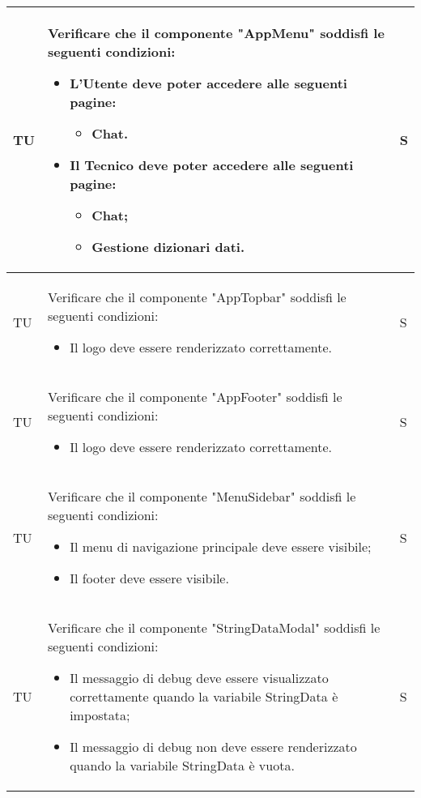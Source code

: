 \begin{adjustwidth}{-0.5cm}{-0.5cm}
\begin{longtable}{|P{1.5cm}|>{\raggedright}P{9.5cm}|>{\arraybackslash}P{1.5cm}|}
    TU & Verificare che il componente "AppMenu" soddisfi le seguenti condizioni:
    \begin{itemize}
      \item L'Utente deve poter accedere alle seguenti pagine:
      \begin{itemize}
        \item Chat.
      \end{itemize}
      \item Il Tecnico deve poter accedere alle seguenti pagine:
      \begin{itemize}
        \item Chat;
        \item Gestione dizionari dati.
      \end{itemize}
    \end{itemize} & S \\
    \hline TU & Verificare che il componente "AppTopbar" soddisfi le seguenti condizioni:
    \begin{itemize}
      \item Il logo deve essere renderizzato correttamente.
    \end{itemize} & S \\
    \hline TU & Verificare che il componente "AppFooter" soddisfi le seguenti condizioni:
    \begin{itemize}
      \item Il logo deve essere renderizzato correttamente.
    \end{itemize} & S \\
    \hline TU & Verificare che il componente "MenuSidebar" soddisfi le seguenti condizioni:
    \begin{itemize}
      \item Il menu di navigazione principale deve essere visibile;
      \item Il footer deve essere visibile.
    \end{itemize} & S \\
    \hline TU & Verificare che il componente "StringDataModal" soddisfi le seguenti condizioni:
    \begin{itemize}
      \item Il messaggio di debug deve essere visualizzato correttamente quando la variabile StringData è impostata;
      \item Il messaggio di debug non deve essere renderizzato quando la variabile StringData è vuota.
    \end{itemize} & S \\

\end{longtable}
\end{adjustwidth}
